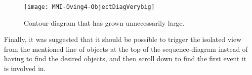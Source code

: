 \begin{figure}[ht]
	\centering
	\texttt{[image: MMI-Oving4-ObjectDiagVerybig]}
	\caption{Contour-diagram that has grown unnecessarily large.}
	\label{fig:MMI-Oving4-ObjectDiagVerybig}
\end{figure}

Finally, it was suggested that it should be possible to trigger the isolated view from the mentioned line of objects at the top of the sequence-diagram instead of having to find the desired objects, and then scroll down to find the first event it is involved in.%
